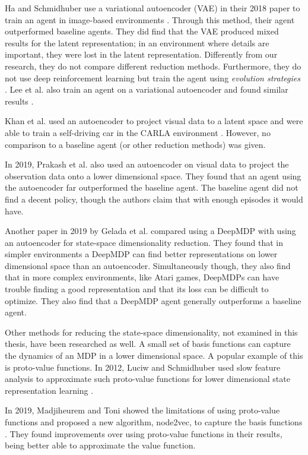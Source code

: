 Ha and Schmidhuber use a variational autoencoder (VAE) \cite{vae} in their 2018 paper to train an agent in image-based environments \cite{rl_vae}. Through this method, their agent outperformed baseline agents. They did find that the VAE produced mixed results for the latent representation; in an environment where details are important, they were lost in the latent representation. Differently from our research, they do not compare different reduction methods. Furthermore, they do not use deep reinforcement learning but train the agent using \textit{evolution strategies} \cite{es}. Lee et al. also train an agent on a variational autoencoder and found similar results \cite{rl_vaetwo}.

Khan et al. used an autoencoder to project visual data to a latent space and were able to train a self-driving car in the CARLA environment \cite{rl_carla}\cite{carla}. However, no comparison to a baseline agent (or other reduction methods) was given.

In 2019, Prakash et al. \cite{AE_2019} also used an autoencoder on visual data to project the observation data onto a lower dimensional space. They found that an agent using the autoencoder far outperformed the baseline agent. The baseline agent did not find a decent policy, though the authors claim that with enough episodes it would have.

Another paper in 2019 by Gelada et al. \cite{deepmdp} compared using a DeepMDP with using an autoencoder for state-space dimensionality reduction. They found that in simpler environments a DeepMDP can find better representations on lower dimensional space than an autoencoder. Simultaneously though, they also find that in more complex environments, like Atari games, DeepMDPs can have trouble finding a good representation and that its loss can be difficult to optimize. They also find that a DeepMDP agent generally outperforms a baseline agent. 

Other methods for reducing the state-space dimensionality, not examined in this thesis, have been researched as well. A small set of basis functions can capture the dynamics of an MDP in a lower dimensional space. A popular example of this is proto-value functions. In 2012, Luciw and Schmidhuber used slow feature analysis to approximate such proto-value functions for lower dimensional state representation learning \cite{proto}. 

In 2019, Madjiheurem and Toni showed the limitations of using proto-value functions and proposed a new algorithm, node2vec, to capture the basis functions \cite{noproto}. They found improvements over using proto-value functions in their results, being better able to approximate the value function.

